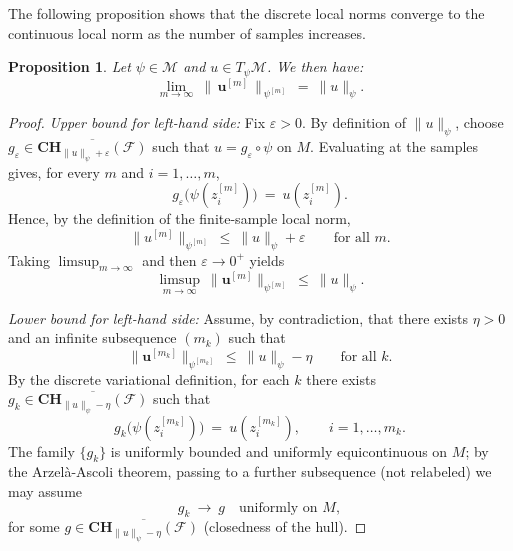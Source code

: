 \documentclass[12pt]{amsart}
\numberwithin{equation}{section}
\newtheorem{proposition}{Proposition}[section]
\theoremstyle{remark}
\begin{document}
The following proposition shows that the discrete local norms converge to the continuous local norm as the number of samples increases.

\begin{proposition}
\label{prop:local_norm_convergence}
Let \(\psi\in\mathcal M\) and \(u\in T_\psi\mathcal M\). We then have:
\begin{equation}
\lim_{m\to\infty}\ \big\|\, \mathbf u^{[m]}\,\big\|_{\,\psi^{[m]}}\ =\ \|u\|_{\psi}.
\end{equation}
\end{proposition}

\begin{proof}
\emph{Upper bound for left-hand side:}
Fix $\varepsilon>0$. By definition of $\|u\|_\psi$, choose $g_\varepsilon\in \overline{\mathbf{CH}_{\|u\|_\psi+\varepsilon}(\mathcal F)}$ such that
$u=g_\varepsilon\circ\psi$ on $M$.
Evaluating at the samples gives, for every $m$ and $i=1,\dots,m$,
\begin{equation}
g_\varepsilon\big(\psi(z^{[m]}_i)\big)\ =\ u(z^{[m]}_i).
\end{equation}
Hence, by the definition of the finite-sample local norm,
\begin{equation}
\|u^{[m]}\|_{\psi^{[m]}}\ \le\ \|u\|_\psi+\varepsilon\qquad\text{for all }m.
\end{equation}
Taking $\limsup_{m\to\infty}$ and then $\varepsilon\to  0^+$ yields
\begin{equation}
\limsup_{m\to\infty}\ \|\mathbf u^{[m]}\|_{\psi^{[m]}}\ \le\ \|u\|_\psi.
\end{equation}

\medskip\noindent
\emph{Lower bound for left-hand side:}
Assume, by contradiction, that there exists $\eta>0$ and an infinite subsequence $(m_k)$ such that
\begin{equation}
\|\mathbf u^{[m_k]}\|_{\psi^{[m_k]}}\ \le\ \|u\|_\psi-\eta\qquad\text{for all }k.
\end{equation}
By the discrete variational definition, for each $k$ there exists
$g_k\in \overline{\mathbf{CH}_{\|u\|_\psi-\eta}(\mathcal F)}$ such that
\begin{equation}\label{eq:sample_match}
g_k\big(\psi(z^{[m_k]}_i)\big)\ =\ u(z^{[m_k]}_i),\qquad i=1,\dots,m_k.
\end{equation}
The family $\{g_k\}$ is uniformly bounded and uniformly equicontinuous on $M$;
by the Arzelà-Ascoli theorem, passing to a further subsequence (not relabeled) we may assume
\begin{equation}
g_k\ \to\ g\quad\text{uniformly on }M,
\end{equation}
for some $g\in \overline{\mathbf{CH}_{\|u\|_\psi-\eta}(\mathcal F)}$ (closedness of the hull).


\end{proof}
\end{document}
